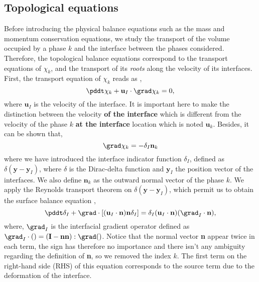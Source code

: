 \subsection{Topological equations}

Before introducing the physical balance equations such as the mass and momentum conservation equations, we study the transport of the volume occupied by a phase $k$ and the interface between the phases considered. 
Therefore, the topological balance equations correspond to the transport equations of $\chi_k$, and the transport of its \textit{roots} along the velocity of its interfaces. 
First, the transport equation of $\chi_k$ reads as \citep{drew1983mathematical,kataoka1986local,morel2015mathematical},
\begin{equation}
    \pddt \chi_k
    + \textbf{u}_I \cdot \grad \chi_k 
    = 0,
    \label{eq:phaseindicator_transport}
\end{equation}
where $\textbf{u}_I$ is the velocity of the interface.
It is important here to make the distinction between the velocity \textbf{of the interface} which is different from the velocity of the phase $k$ \textbf{at the interface} location which is noted $\textbf{u}_k$.
Besides, it can be shown \citep{tryggvason2011direct} that, 
\begin{equation}
    \grad \chi_k 
    = - \delta_I \textbf{n}_k   
\end{equation}
where we have introduced the interface indicator function $\delta_I$, defined as $\delta(\textbf{y}-\textbf{y}_I)$, where $\delta$ is the Dirac-delta function and $\textbf{y}_I$ the position vector of the interfaces. 
We also define $\textbf{n}_k$ as the outward normal vector of the phase $k$. 
We apply the Reynolds transport theorem on $\delta(\textbf{y}-\textbf{y}_I)$, which permit us to obtain the surface balance equation \citep{lhuillier2003dynamics,morel2015mathematical}, 
\begin{equation}
    \pddt \delta_I
    + \grad \cdot\left[
        (\textbf{u}_I\cdot\textbf{n})\textbf{n}\delta_I 
    \right]
    = \delta_I (\textbf{u}_I\cdot\textbf{n})
    (\grad_I\cdot\textbf{n}),
    \label{eq:interface_transport}
\end{equation}
where, $\grad_I$ is the interfacial gradient operator defined as $\grad_I\cdot() = (\textbf{I}-\textbf{nn}):\grad()$.
Notice that the normal vector \textbf{n} appear twice in each term, the sign has therefore no importance and there isn't any ambiguity regarding the definition of \textbf{n}, so we removed the index $k$.  
The first term on the right-hand side (RHS) of this equation corresponds to the source term due to the deformation of the interface.
